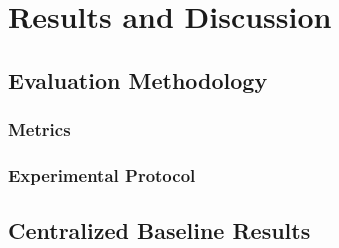 \chapter{Results and Discussion}
\label{ch:results-discussion}

\section{Evaluation Methodology}
\label{sec:eval-methodology}

\subsection{Metrics}

\subsection{Experimental Protocol}

\section{Centralized Baseline Results}
\label{sec:centralized-results}



